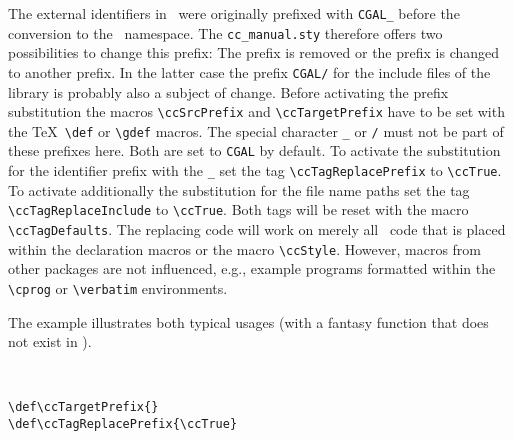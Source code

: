 \documentclass[11pt]{article}
\begin{document}
The external identifiers in \cgal\ were originally prefixed with {\tt CGAL\_}
before the conversion to the \cgal\ namespace. The {\tt cc\_manual.sty}
therefore offers two possibilities to change this prefix: The prefix is removed
or the prefix is changed to another prefix. In the latter case the
prefix {\tt CGAL/} for the include files of the library is probably
also a subject of change. Before activating the prefix substitution
the macros \verb+\ccSrcPrefix+ and \verb+\ccTargetPrefix+ have to be
set with the \TeX\ \verb+\def+ or \verb+\gdef+ macros. The special character
{\tt \_} or {\tt /} must not be part of these prefixes here. Both are
set to {\tt CGAL} by default. To activate the substitution for the
identifier prefix with the {\tt \_} set the tag
\verb+\ccTagReplacePrefix+ to \verb+\ccTrue+. To activate additionally
the substitution for the file name paths set the tag
\verb+\ccTagReplaceInclude+ to \verb+\ccTrue+. Both tags will be
reset with the macro \verb+\ccTagDefaults+. The replacing code will
work on merely all \CC\ code that is placed within the declaration
macros or the macro \verb+\ccStyle+. However, macros from other
packages are not influenced, e.g., example programs formatted within
the \verb+\cprog+ or \verb+\verbatim+ environments.

The example illustrates both typical usages (with a fantasy function
that does not exist in \cgal).

\lcTex{\ccwIndent=6mm}

\hspace*{6mm}
\\
\vspace{-\parskip}

\begin{tabbing}
  \> \verb+\def\ccTargetPrefix{}+ \\
  \> \verb+\def\ccTagReplacePrefix{\ccTrue}+
\end{tabbing}
\def\ccTargetPrefix{}
\def\ccTagReplacePrefix{\ccTrue}
\vspace{-\parskip}

\hspace*{6mm}
\\
\vspace{-\parskip}
\end{document}
